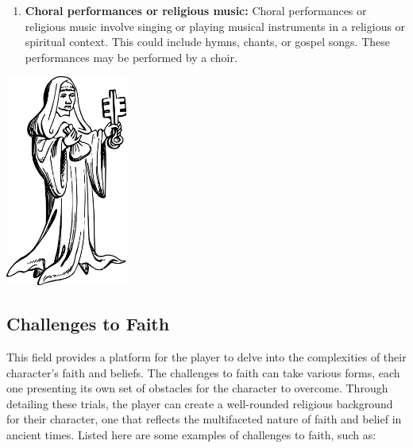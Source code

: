 \documentclass[12pt]{book}  %
\begin{document}
\begin{enumerate}
    \item \textbf{Choral performances or religious music:}
    Choral performances or religious music involve singing or playing musical instruments in a religious or spiritual context. This could include hymns, chants, or gospel songs. These performances may be performed by a choir.
    
\end{enumerate}

\begin{center}
    \includegraphics[width=0.3\textwidth]{./images/religion05.pdf}
\end{center}

\subsection{\textbf{Challenges to Faith}}

This field provides a platform for the player to delve into the complexities of their character's faith and beliefs. The challenges to faith can take various forms, each one presenting its own set of obstacles for the character to overcome. Through detailing these trials, the player can create a well-rounded religious background for their character, one that reflects the multifaceted nature of faith and belief in ancient times. Listed here are some examples of challenges to faith, such as:
\end{document}
